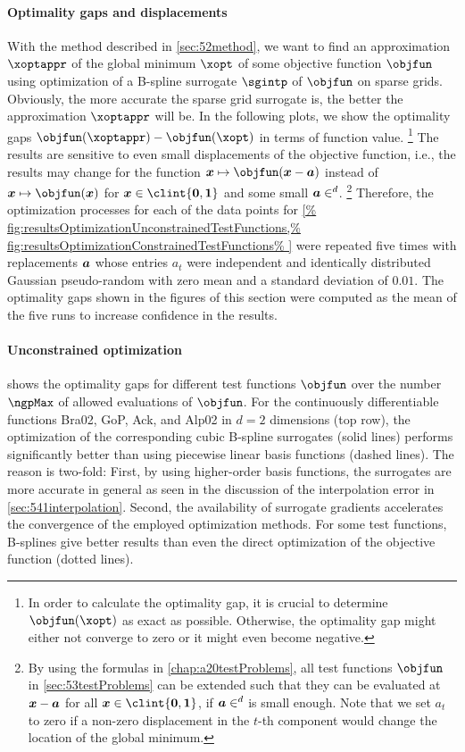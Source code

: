 \paragraph{Optimality gaps and displacements}

With the method described in \cref{sec:52method},
we want to find an approximation $\xoptappr$ of the
global minimum $\xopt$ of some objective function $\objfun$
using optimization of a B-spline surrogate $\sgintp$ of $\objfun$
on sparse grids.
Obviously, the more accurate the sparse grid surrogate is,
the better the approximation $\xoptappr$ will be.
In the following plots,
we show the optimality gaps $\objfun(\xoptappr) - \objfun(\xopt)$
in terms of function value.%
\footnote{%
  In order to calculate the optimality gap,
  it is crucial to determine $\objfun(\xopt)$ as exact as possible.
  Otherwise, the optimality gap might either not converge to zero
  or it might even become negative.%
}
The results are sensitive to even small displacements
of the objective function, i.e.,
the results may change for the
function $\*x \mapsto \objfun(\*x - \*a)$
instead of $\*x \mapsto \objfun(\*x)$ for $\*x \in \clint{\*0, \*1}$
and some small $\*a \in \real^d$.%
\footnote{%
  By using the formulas in \cref{chap:a20testProblems},
  all test functions $\objfun$ in \cref{sec:53testProblems}
  can be extended such that they can be evaluated at ${\boldsymbol{x}} - {\boldsymbol{a}}$
  for all $\*x \in \clint{\*0, \*1}$, if $\*a \in \real^d$ is small enough.
  Note that we set $a_t$ to zero if a non-zero displacement in
  the $t$-th component would change the location of the global minimum.%
}
Therefore, the optimization processes for each of the
data points for \cref{%
  fig:resultsOptimizationUnconstrainedTestFunctions,%
  fig:resultsOptimizationConstrainedTestFunctions%
}
were repeated five times with replacements ${\boldsymbol{a}}$
whose entries $a_t$ were independent and identically distributed Gaussian
pseudo-random with zero mean and a standard deviation of $0.01$.
The optimality gaps shown in the figures of this section were computed
as the mean of the five runs to increase confidence in the results.

\paragraph{Unconstrained optimization}

shows the optimality gaps for different test functions $\objfun$
over the number $\ngpMax$ of allowed evaluations of $\objfun$.
For the continuously differentiable functions Bra02, GoP, Ack, and Alp02
in $d = 2$ dimensions (top row),
the optimization of the corresponding cubic B-spline surrogates (solid lines)
performs significantly better than using piecewise linear basis functions
(dashed lines).
The reason is two-fold:
First, by using higher-order basis functions, the surrogates are more accurate
in general as seen in the discussion of the interpolation error in
\cref{sec:541interpolation}.
Second, the availability of surrogate gradients accelerates the
convergence of the employed optimization methods.
For some test functions, B-splines give better results than even
the direct optimization of the objective function (dotted lines).

